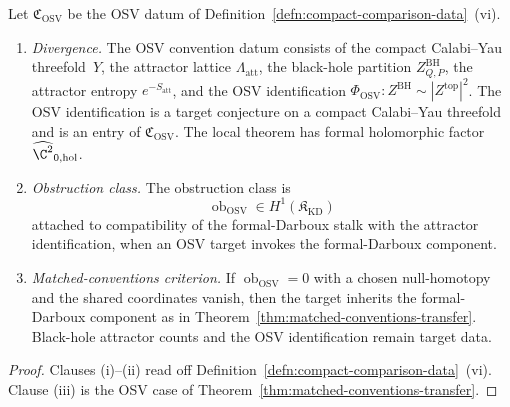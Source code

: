 \begin{thm}\label{thm:divergence-osv}
  Let \(\mathfrak C_{\mathrm{OSV}}\) be the OSV datum of
  Definition~\ref{defn:compact-comparison-data}~(vi).
  \begin{enumerate}[label=(\roman*)]
    \item \emph{Divergence.}  The OSV convention datum consists of the
      compact Calabi--Yau threefold~\(Y\), the attractor lattice
      \(\Lambda_{\mathrm{att}}\), the black-hole partition
      \(Z^{\mathrm{BH}}_{Q,P}\), the attractor entropy
      \(e^{-S_{\mathrm{att}}}\), and the OSV identification
      \(\Phi_{\mathrm{OSV}}\colon Z^{\mathrm{BH}}\sim
      |Z^{\mathrm{top}}|^2\).  The OSV identification is a target
      conjecture on a compact Calabi--Yau threefold and is an entry of
      \(\mathfrak C_{\mathrm{OSV}}\).  The local theorem has formal
      holomorphic factor \(\widehat{\C^2}_{0,\mathrm{hol}}\).
    \item \emph{Obstruction class.}  The obstruction class is
      \[
        \operatorname{ob}_{\mathrm{OSV}}
          \in
          H^1(\mathfrak K_{\mathrm{KD}})
      \]
      attached to compatibility of the formal-Darboux stalk with the
      attractor identification, when an OSV target invokes the
      formal-Darboux component.
    \item \emph{Matched-conventions criterion.}  If
      \(\operatorname{ob}_{\mathrm{OSV}}=0\) with a chosen
      null-homotopy and the shared coordinates vanish, then the
      target inherits the formal-Darboux component as in
      Theorem~\ref{thm:matched-conventions-transfer}.  Black-hole
      attractor counts and the OSV identification remain target
      data.
  \end{enumerate}
\end{thm}

\begin{proof}
  Clauses (i)--(ii) read off
  Definition~\ref{defn:compact-comparison-data}~(vi).
  Clause (iii) is the OSV case of
  Theorem~\ref{thm:matched-conventions-transfer}.
\end{proof}

